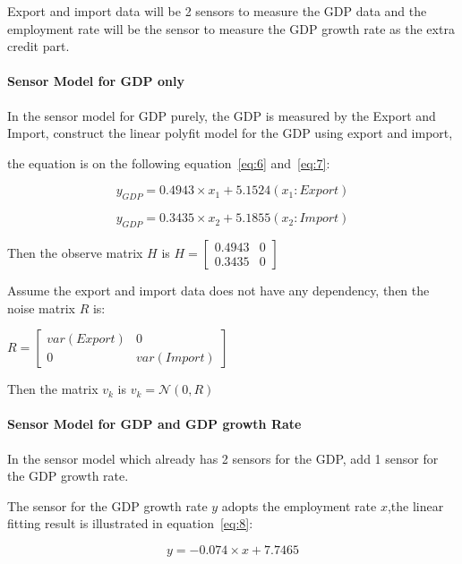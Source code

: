 \documentclass[11pt, a4paper]{article}
\begin{document}
Export and import data will be 2 sensors to measure the GDP data and the employment rate will be the sensor to measure the GDP growth rate as the extra credit part. 

\paragraph{Sensor Model for GDP only}

In the sensor model for GDP purely, the GDP is measured by the Export and Import, construct the linear polyfit model for the GDP using export and import, 

the equation is on the following equation~\ref{eq:6} and~\ref{eq:7}:

\begin{equation}
y_{GDP} = 0.4943\times x_1 + 5.1524 (x_1:Export)
\label{eq:6}
\end{equation}

\begin{equation}
y_{GDP} = 0.3435\times x_2 + 5.1855 (x_2:Import)
\label{eq:7}
\end{equation}


Then the observe matrix $H$ is $H = \begin{bmatrix} 0.4943 & 0 \\ 0.3435 & 0   \end{bmatrix}$


Assume the export and import data does not have any dependency, then the noise matrix $R$ is:

\begin{center}
	$R = \begin{bmatrix} var(Export) & 0  \\ 0 & var(Import)  \end{bmatrix}$
\end{center}

Then the matrix $v_k$ is $v_k = \mathcal{N}(0,R)$

\paragraph{Sensor Model for GDP and GDP growth Rate}

In the sensor model which already has 2 sensors for the GDP, add 1 sensor for the GDP growth rate. 

The sensor for the GDP growth rate $y$ adopts the employment rate $x$,the linear fitting result is illustrated in equation~\ref{eq:8}:

\begin{equation}
y = -0.074\times x + 7.7465 
\label{eq:8}
\end{equation}
\end{document}
